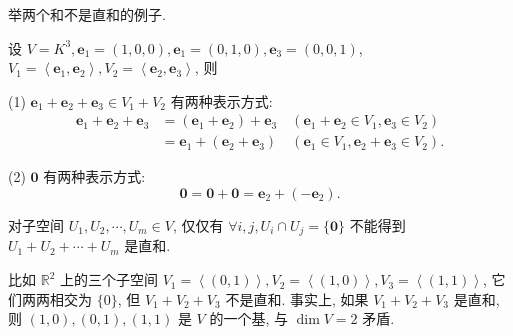 \documentclass{ctexart}
\begin{document}
举两个和不是直和的例子.
\begin{example}
    设 $V=K^3,\boldsymbol{e}_1=(1,0,0),\boldsymbol{e}_1=(0,1,0),\boldsymbol{e}_3=(0,0,1)$, $V_1=\left<\boldsymbol{e}_1,\boldsymbol{e}_2\right>,V_2=\left<\boldsymbol{e}_2,\boldsymbol{e}_3\right>$, 则
    
    (1) $\boldsymbol{e}_1+\boldsymbol{e}_2+\boldsymbol{e}_3\in V_1+V_2$ 有两种表示方式:
    \begin{align*}
        \boldsymbol{e}_1+\boldsymbol{e}_2+\boldsymbol{e}_3 & =(\boldsymbol{e}_1+\boldsymbol{e}_2)+\boldsymbol{e}_3\quad(\boldsymbol{e}_1+\boldsymbol{e}_2\in V_1,\boldsymbol{e}_3\in V_2) \\
        & =\boldsymbol{e}_1+(\boldsymbol{e}_2+\boldsymbol{e}_3)\quad(\boldsymbol{e}_1\in V_1,\boldsymbol{e}_2+\boldsymbol{e}_3\in V_2).
    \end{align*}

    (2) $\boldsymbol{0}$ 有两种表示方式:
    \[\boldsymbol{0}=\boldsymbol{0}+\boldsymbol{0}=\boldsymbol{e}_2+(-\boldsymbol{e}_2).\]
\end{example}
\begin{example}
    对子空间 $U_1,U_2,\cdots,U_m\in V$, 仅仅有 $\forall i,j,U_i\cap U_j=\{\boldsymbol{0}\}$ 不能得到 $U_1+U_2+\cdots+U_m$ 是直和.

    比如 $\mathbb{R}^2$ 上的三个子空间 $V_1=\left<(0,1)\right>,V_2=\left<(1,0)\right>,V_3=\left<(1,1)\right>$, 它们两两相交为 $\{0\}$, 但 $V_1+V_2+V_3$ 不是直和. 事实上, 如果 $V_1+V_2+V_3$ 是直和, 则 $(1,0),(0,1),(1,1)$ 是 $V$ 的一个基, 与 $\dim V=2$ 矛盾. 
\end{example}
\end{document}
